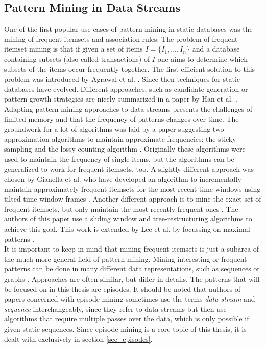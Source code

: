 \subsection{Pattern Mining in Data Streams}
\label{subsec_PatternMining}
One of the first popular use cases of pattern mining in static databases was the mining of frequent itemsets and association rules. The problem of frequent itemset mining is that if given a set of items $I = \{I_1,...,I_n\}$ and a database containing subsets (also called transactions) of $I$ one aims to determine which subsets of the items occur frequently together. The first efficient solution to this problem was introduced by Agrawal et al. \cite{agrawal1993mining}. Since then techniques for static databases have evolved. Different approaches, such as candidate generation or pattern growth strategies are nicely summarized in a paper by Han et al. \cite{han2007frequent}. Adapting pattern mining approaches to data streams presents the challenges of limited memory and that the frequency of patterns changes over time. The groundwork for a lot of algorithms was laid by a paper suggesting two approximation algorithms to maintain approximate frequencies: the sticky sampling and the lossy counting algorithm \cite{manku2002approximate}. Originally these algorithms were used to maintain the frequency of single items, but the algorithms can be generalized to work for frequent itemsets, too. A slightly different approach was chosen by Gianella et al. who have developed an algorithm to incrementally maintain approximately frequent itemsets for the most recent time windows using tilted time window frames \cite{giannella2003mining}. Another different approach is to mine the exact set of frequent itemsets, but only maintain the most recently frequent ones \citep{tanbeer2009sliding}. The authors of this paper use a sliding window and tree-restructuring algorithms to achieve this goal. This work is extended by Lee et al. by focussing on maximal patterns \cite{lee2014sliding}. \\
It is important to keep in mind that mining frequent itemsets is just a subarea of the much more general field of pattern mining. Mining interesting or frequent patterns can be done in many different data representations, such as sequences \cite{mendes2008stream} or graphs \cite{bifet2011mining}. Approaches are often similar, but differ in details. The patterns that will be focused on in this thesis are episodes. It should be noted that authors of papers concerned with episode mining sometimes use the terms \textit{data stream} and \textit{sequence} interchangeably, since they refer to data streams but then use algorithms that require multiple passes over the data, which is only possible if given static sequences. Since episode mining is a core topic of this thesis, it is dealt with exclusively in section \ref{sec_episodes}.

